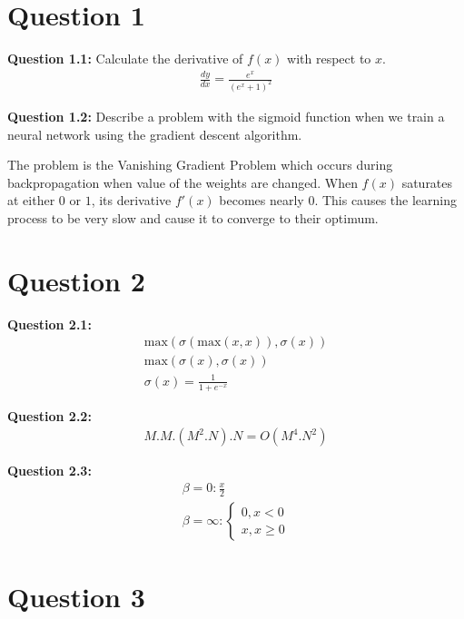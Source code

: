 \documentclass[12pt]{article}
\begin{document}
\maketitle

\section*{Question 1}

\textbf{Question 1.1:} Calculate the derivative of $f(x)$ with respect to $x$.
\begin{gather*}
    \frac{dy}{dx} = \frac{e^x}{(e^x + 1)^2}
\end{gather*}

\textbf{Question 1.2:} Describe a problem with the sigmoid function when we
train a neural network using the gradient descent algorithm.

The problem is the Vanishing Gradient Problem which occurs during
backpropagation when value of the weights are changed. When $f(x)$ saturates at
either $0$ or $1$, its derivative $f'(x)$ becomes nearly $0$. This causes the
learning process to be very slow and cause it to converge to their optimum. 

\section*{Question 2}

\textbf{Question 2.1:} 
\begin{gather*}
    \text{max}(\sigma(\text{max}(x,x)), \sigma(x)) \\ 
    \text{max}(\sigma(x), \sigma(x)) \\ 
    \sigma(x) = \frac{1}{1 + e^{-x}} 
\end{gather*}

\textbf{Question 2.2:} 
\begin{gather*}
    M.M.(M^2.N).N = O(M^4.N^2)
\end{gather*}

\textbf{Question 2.3:} 
\begin{gather*}
    \beta = 0: \frac{x}{2} \\ 
    \beta = \infty: \begin{cases}
        0, x < 0 \\
        x, x \geq 0
    \end{cases}
\end{gather*}

\pagebreak

\section*{Question 3}
\end{document}
